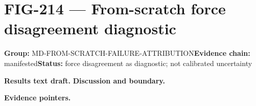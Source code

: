 \clearpage
\section{FIG-214 --- From-scratch force disagreement diagnostic}
\label{figpage:fig-214}
\textbf{Group:} MD-FROM-SCRATCH-FAILURE-ATTRIBUTION\quad \textbf{Evidence chain:} manifested\quad \textbf{Status:} force disagreement as diagnostic; not calibrated uncertainty

\textbf{Results text draft.} 
\textbf{Discussion and boundary.} 


\textbf{Evidence pointers.}



\vfill

